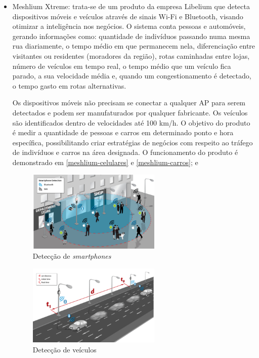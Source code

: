 \begin{itemize}
\item Meshlium Xtreme: trata-se de um produto da empresa Libelium que detecta dispositivos móveis e veículos através de sinais Wi-Fi e Bluetooth, visando otimizar a inteligência nos negócios. O sistema conta pessoas e automóveis, gerando informações \cite{libelium} como: quantidade de indivíduos passando numa mesma rua diariamente, o tempo médio em que permanecem nela, diferenciação entre visitantes ou residentes (moradores da região), rotas caminhadas entre lojas, número de veículos em tempo real, o tempo médio que um veículo fica parado, a sua velocidade média e, quando um congestionamento é detectado, o tempo gasto em rotas alternativas.

Os dispositivos móveis não precisam se conectar a qualquer AP para serem detectados e podem ser manufaturados por qualquer fabricante. Os veículos são identificados dentro de velocidades até 100 km/h. O objetivo do produto é medir a quantidade de pessoas e carros em determinado ponto e hora específica, possibilitando criar estratégias de negócios com respeito ao tráfego de indivíduos e carros na área designada. 
O funcionamento do produto é demonstrado em \autoref{meshlium-celulares} e \autoref{meshlium-carros}; e

\begin{figure}[htb]
  \caption{\label{meshlium-celulares}Detecção de \emph{smartphones}}
  \begin{center}
    \includegraphics[width=0.60\textwidth]{img/meshlium-celulares.png}
  \end{center}
\end{figure}

\begin{figure}[htb]
  \caption{\label{meshlium-carros}Detecção de veículos}
  \begin{center}
    \includegraphics[width=0.60\textwidth]{img/meshlium-carros.png}
  \end{center}
\end{figure}


\end{itemize}
